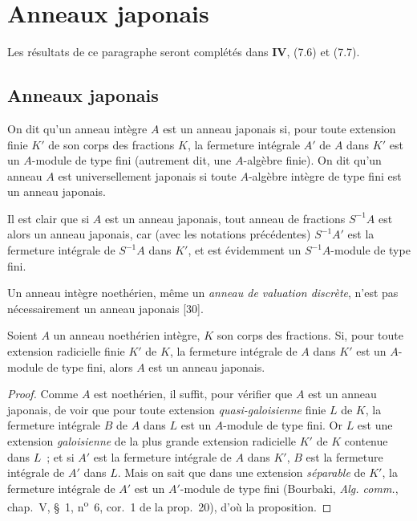 \section{Anneaux japonais}
\label{section:0.23-fr}

Les résultats de ce paragraphe seront complétés dans \textbf{IV}, (7.6) et (7.7).

\subsection{Anneaux japonais}
\label{subsection:0.23.1-fr}

\begin{definition}[23.1.1]
\label{0.23.1.1-fr}
On dit qu'un anneau intègre $A$ est un anneau japonais si, pour toute
extension finie $K'$ de son corps des fractions $K$, la fermeture intégrale
$A'$ de $A$ dans $K'$ est
un $A$-module de type fini \textup{(autrement dit, une $A$-algèbre} finie\textup{)}. On dit
qu'un anneau $A$ est universellement japonais si toute $A$-algèbre intègre de
type fini est un anneau japonais.
\end{definition}

Il est clair que si $A$ est un anneau japonais, tout anneau de fractions
$S^{-1}A$ est alors un anneau japonais, car (avec les notations précédentes)
$S^{-1}A'$ est la fermeture intégrale de $S^{-1}A$ dans $K'$, et est
évidemment un $S^{-1}A$-module de type fini.

Un anneau intègre noethérien, même un \emph{anneau de valuation discrète},
n'est pas nécessairement un anneau japonais [30].

\begin{proposition}[23.1.2]
\label{0.23.1.2-fr}
Soient $A$ un anneau noethérien intègre, $K$ son corps des fractions. Si, pour
toute extension \textup{radicielle} finie $K'$ de $K$, la fermeture intégrale de $A$
dans $K'$ est un $A$-module de type fini, alors $A$ est un anneau japonais.
\end{proposition}

\begin{proof}
Comme $A$ est noethérien, il suffit, pour vérifier que $A$ est un anneau
japonais, de voir que pour toute extension \emph{quasi-galoisienne} finie $L$ de
$K$, la fermeture intégrale $B$ de $A$ dans $L$ est un $A$-module de type
fini. Or $L$ est une extension \emph{galoisienne} de la plus grande extension
radicielle $K'$ de $K$ contenue dans $L$~; et si $A'$ est la fermeture
intégrale de $A$ dans $K'$, $B$ est la fermeture intégrale de $A'$ dans $L$.
Mais on sait que dans une extension \emph{séparable} de $K'$, la fermeture intégrale
de $A'$ est un $A'$-module de type fini (Bourbaki, \emph{Alg. comm.},
chap.~V, §~1, n\textsuperscript{o}~6, cor.~1 de la prop.~20), d'où la
proposition.
\end{proof}

